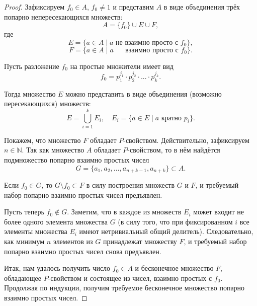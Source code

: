 \documentclass[a4paper,openbib]{article}
\theoremstyle{definition}
\begin{document}
\begin{proof}
	Зафиксируем $f_0\in A$, $f_0 \neq 1$ и представим $A$ в виде объединения трёх попарно непересекающихся множеств:
	\begin{equation}
		A = \{f_0\} \cup E \cup F
		,
	\end{equation}
	где
	\begin{equation}
		E = \{ a \in A \mid a \mbox{~не взаимно просто с~} f_0 \}
		,
	\end{equation}
	\begin{equation}
		F = \{ a \in A \mid a \mbox{ ~~~~взаимно просто с~} f_0 \}
		.
	\end{equation}

	Пусть разложение $f_0$ на простые множители имеет вид
	\begin{equation}
		f_0 = p_1^{j_1} \cdot p_2^{j_2} \cdot ... \cdot p_k^{j_k}
		.
	\end{equation}

	Тогда множество $E$ можно представить в виде объединения (возможно пересекающихся) множеств:
	\begin{equation}
		E = \bigcup_{i=1}^{k} E_i,\quad E_i = \{a\in E \mid a \mbox{~кратно~} p_i\}
		.
	\end{equation}

	Покажем, что множество $F$ обладает $P$-свойством.
	Действительно, зафиксируем $n\in\mathbb{N}$.
	Так как множество $A$ обладает $P$-свойством,
	то в нём найдётся подмножество попарно взаимно простых чисел
	$$G=\{a_1, a_2, ..., a_{n+k-1}, a_{n+k}\}\subset A.$$

	Если $f_0\in G$, то $G\setminus f_0 \subset F$ в силу построения множеств $G$ и $F$, и требуемый набор попарно взаимно простых чисел предъявлен.

	Пусть теперь $f_0\notin G$.
	Заметим, что в каждое из множеств $E_i$ может входит не более одного элемента множества $G$
	(в силу того, что при фиксированном $i$ все элементы множества $E_i$ имеют нетривиальный общий делитель).
	Следовательно, как минимум $n$ элементов из $G$ принадлежат множеству $F$,
	и требуемый набор попарно взаимно простых чисел снова предъявлен.


	Итак, нам удалось получить число $f_0\in A$ и бесконечное множество $F$, обладающее $P$-свойством
	и состоящее из чисел, взаимно простых с $f_0$.
	Продолжая по индукции, получим требуемое бесконечное множество попарно взаимно простых чисел.
\end{proof}
\end{document}
